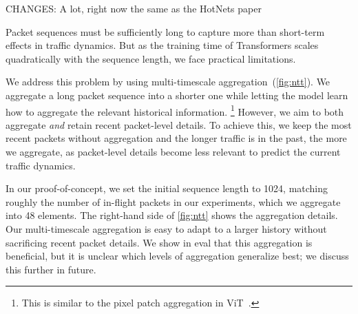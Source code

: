 CHANGES: A lot, right now the same as the HotNets paper

Packet sequences must be sufficiently long to capture more than short-term effects in traffic dynamics.
But as the training time of Transformers scales quadratically with the sequence length, we face practical limitations.

We address this problem by using multi-timescale aggregation~(\ref{fig:ntt}).
We aggregate a long packet sequence into a shorter one while letting the model learn how to aggregate the relevant historical information.%
%
\footnote{This is similar to the pixel patch aggregation in ViT~\cite{dosovitskiyImageWorth16x162021}.}
%
However, we aim to both aggregate \emph{and} retain recent packet-level details.
To achieve this, we keep the most recent packets without aggregation and the longer traffic is in the past, the more we aggregate, as packet-level details become less relevant to predict the current traffic dynamics.

In our proof-of-concept, we set the initial sequence length to 1024, matching roughly the number of in-flight packets in our experiments, which we aggregate into 48 elements. The right-hand side of \ref{fig:ntt} shows the aggregation details.
Our multi-timescale aggregation is easy to adapt to a larger history without sacrificing recent packet details.
We show in eval that this aggregation is beneficial, but it is unclear which levels of aggregation generalize best; we discuss this further in future.


